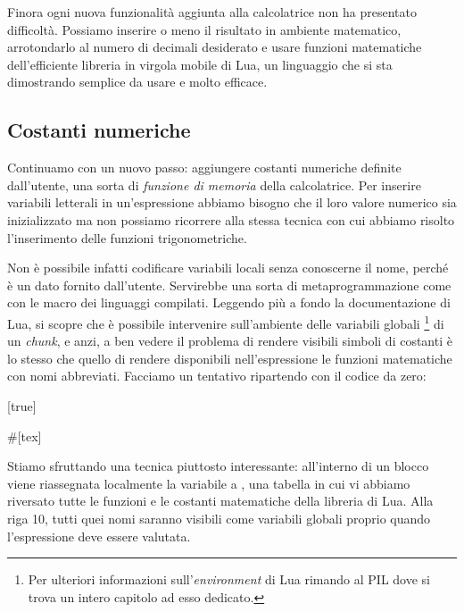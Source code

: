 Finora ogni nuova funzionalità aggiunta alla calcolatrice non ha presentato
difficoltà. Possiamo inserire o meno il risultato in ambiente matematico,
arrotondarlo al numero di decimali desiderato e usare funzioni matematiche
dell'efficiente libreria in virgola mobile di Lua, un linguaggio che si sta
dimostrando semplice da usare e molto efficace.


\subsection{Costanti numeriche}

Continuamo con un nuovo passo: aggiungere costanti numeriche definite
dall'utente, una sorta di \emph{funzione di memoria} della calcolatrice. Per
inserire variabili letterali in un'espressione abbiamo bisogno che il loro
valore numerico sia inizializzato ma non possiamo ricorrere alla stessa tecnica
con cui abbiamo risolto l'inserimento delle funzioni trigonometriche.

Non è possibile infatti codificare variabili locali senza conoscerne il nome,
perché è un dato fornito dall'utente. Servirebbe una sorta di metaprogrammazione
come con le macro dei linguaggi compilati. Leggendo più a fondo la
documentazione di Lua, si scopre che è possibile intervenire sull'ambiente delle
variabili globali \footnote{Per ulteriori informazioni
sull'\emph{environment} di Lua rimando al PIL dove si trova un intero capitolo
ad esso dedicato.} di un \emph{chunk}, e anzi, a ben vedere il problema di
rendere visibili simboli di costanti è lo stesso che quello di rendere
disponibili nell'espressione le funzioni matematiche con nomi abbreviati.
Facciamo un tentativo ripartendo con il codice da zero:

[true]
%
%
\begin{lines}
#[tex]
\newcommand\expr[1]{\directlua{
do
    local _ENV = calclib
    ans = #1
end
tex.print(tostring(calclib.ans))
}}
\end{lines}

Stiamo sfruttando una tecnica piuttosto interessante: all'interno di un blocco
viene riassegnata localmente la variabile  a , una
tabella in cui vi abbiamo riversato tutte le funzioni e le costanti matematiche
della libreria  di Lua. Alla riga 10, tutti quei nomi saranno
visibili come variabili globali proprio quando l'espressione deve essere
valutata.

